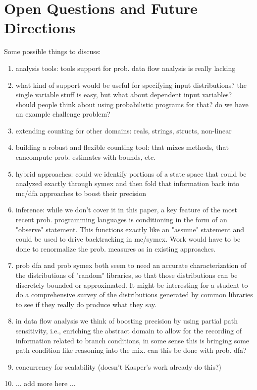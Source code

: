 \section{Open Questions and Future Directions}
\label{sec:future}

Some possible things to discuss:
\begin{enumerate}
\item analysis tools: tools support for prob. data flow analysis is really lacking
\item what kind of support would be useful for specifying input distributions?
the single variable stuff is easy, but what about dependent input variables?
should people think about using probabilistic programs for that?  do we have an example challenge problem?
\item extending counting for other domains: reals, strings, structs, non-linear
\item building a robust and flexible counting tool: that mixes methods, that cancompute prob. estimates with bounds, etc.
\item hybrid approaches: could we identify portions of a state
space that could be analyzed exactly through symex and then fold
that information back into mc/dfa approaches to boost their precision
\item inference: while we don't cover it in this paper, a key feature of
the most recent prob. programming languages is conditioning in the form
of an "observe" statement.  This functions exactly like an "assume" 
statement and could be used to drive backtracking in mc/symex.  Work
would have to be done to renormalize the prob. measures as in existing
approaches.
\item prob dfa and prob symex both seem to need an accurate characterization
of the distributions of "random" libraries, so that those distributions can be 
discretely bounded or approximated.  It might be interesting for a student
to do a comprehensive survey of the distributions generated by common
libraries to see if they really do produce what they say.
\item in data flow analysis we think of boosting precision by using partial
path sensitivity, i.e., enriching the abstract domain to allow for the recording of information related to branch conditions, in some sense this is bringing some path condition like reasoning into the mix.  can this be done with prob. dfa?
\item concurrency for scalability (doesn't Kasper's work already do this?)
\item ... add more here ...
\end{enumerate}
